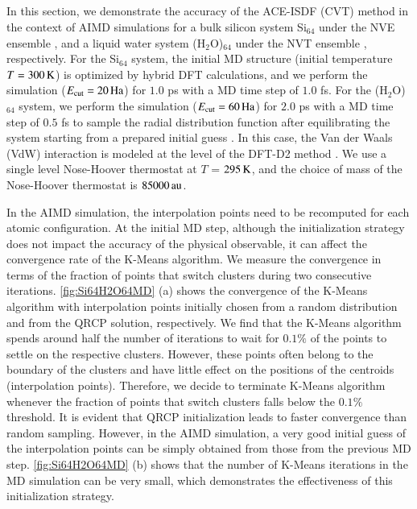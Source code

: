 \subsection{}
\label{c5subsec:conv}

In this section, we demonstrate the accuracy of the ACE\hyp{}ISDF (CVT) method
in the context of AIMD simulations for a bulk silicon system Si$_{64}$ under the
NVE ensemble \cite{gibbs2014elementary}, and a liquid water system (H$_2$O)$_
{64}$ under the NVT ensemble \cite{gibbs2014elementary}, respectively. For the
Si$_{64}$ system, the initial MD structure (initial temperature $T =
300\operatorname{K}$) is optimized by hybrid DFT calculations, and we perform the
simulation ($E_{\text{cut}} = 20\operatorname{Ha}$) for $1.0$ ps with a MD time step of $1.0$
fs. For the (H$_2$O)$_{64}$ system, we perform the simulation ($E_{\text{cut}}
= 60\operatorname{Ha}$) for $2.0$ ps with a MD time step of $0.5$ fs to sample the radial
distribution function after equilibrating the system starting from a prepared
initial guess \cite{JCP_141_084502_2014}. In this case, the Van der Waals (VdW)
interaction is modeled at the level of the DFT\hyp{}D2 method 
\cite{JCC_27_1787_2006_Grimme}. We use a single level Nose\hyp{}Hoover
thermostat \cite{JCP_81_511_1984_Nose,PRA_31_1695_1985_Hoover} at $T$ =
$295\operatorname{K}$, and the choice of mass of the Nose\hyp{}Hoover thermostat is
$85000\operatorname{au}$.

In the AIMD simulation, the interpolation points need to be recomputed for each
atomic configuration. At the initial MD step, although the initialization
strategy does not impact the accuracy of the physical observable, it can affect
the convergence rate of the K\hyp{}Means algorithm. We measure the convergence
in terms of the fraction of points that switch clusters during two consecutive
iterations. \cref{fig:Si64H2O64MD} (a) shows the convergence of the K\hyp{}Means
algorithm with interpolation points initially chosen from a random distribution
and from the QRCP solution, respectively. We find that the K\hyp{}Means
algorithm spends around half the number of iterations to wait for $0.1\%$ of the
points to settle on the respective clusters. However, these points often belong
to the boundary of the clusters and have little effect on the positions of the
centroids (interpolation points). Therefore, we decide to terminate K\hyp{}Means
algorithm whenever the fraction of points that switch clusters falls below the
$0.1\%$ threshold. It is evident that QRCP initialization leads to faster
convergence than random sampling. However, in the AIMD simulation, a very good
initial guess of the interpolation points can be simply obtained from those from
the previous MD step. \cref{fig:Si64H2O64MD} (b) shows that the number of
K\hyp{}Means iterations in the MD simulation can be very small, which
demonstrates the effectiveness of this initialization strategy.

